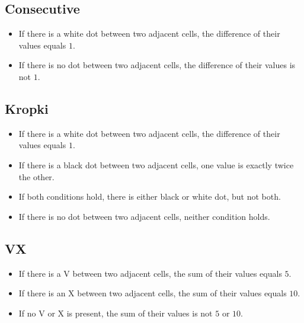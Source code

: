 \subsection*{Consecutive}

\begin{itemize}
    \item If there is a white dot between two adjacent cells, the difference of their values equals $1$.
    \item If there is no dot between two adjacent cells, the difference of their values is not $1$.
\end{itemize}


\subsection*{Kropki}

\begin{itemize}
    \item If there is a white dot between two adjacent cells, the difference of their values equals $1$.
    \item If there is a black dot between two adjacent cells, one value is exactly twice the other.
    \item If both conditions hold, there is either black or white dot, but not both.
    \item If there is no dot between two adjacent cells, neither condition holds.
\end{itemize}


\subsection*{VX}

\begin{itemize}
    \item If there is a V between two adjacent cells, the sum of their values equals $5$.
    \item If there is an X between two adjacent cells, the sum of their values equals $10$.
    \item If no V or X is present, the sum of their values is not $5$ or $10$.
\end{itemize}


